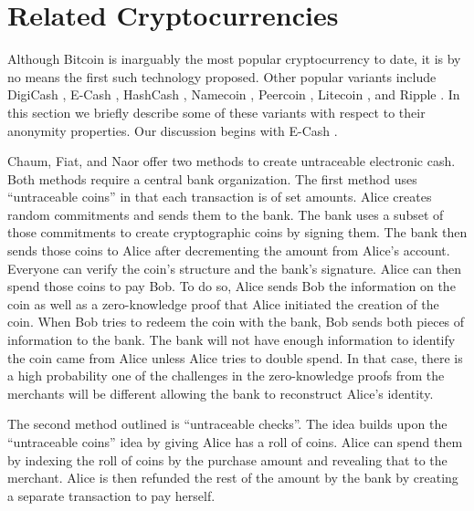 \section{Related Cryptocurrencies}
Although Bitcoin is inarguably the most popular cryptocurrency to date, it is by no means the first such technology proposed. Other popular variants include DigiCash \cite{digicash}, E-Cash \cite{ecash}, HashCash \cite{hashcash}, Namecoin \cite{namecoin}, Peercoin \cite{peercoin}, Litecoin \cite{litecoin}, and Ripple \cite{ripple}. In this section we briefly describe some of these variants with respect to their anonymity properties. Our discussion begins with E-Cash \cite{ecash}.

Chaum, Fiat, and Naor offer two methods to create untraceable electronic cash. Both methods require a central bank organization.  The first method uses “untraceable coins” in that each transaction is of set amounts. Alice creates random commitments and sends them to the bank.  The bank uses a subset of those commitments to create cryptographic coins by signing them.  The bank then sends those coins to Alice after decrementing the amount from Alice’s account.  Everyone can verify the coin’s structure and the bank’s signature. Alice can then spend those coins to pay Bob.  To do so, Alice sends Bob the information on the coin as well as a zero-knowledge proof that Alice initiated the creation of the coin.  When Bob tries to redeem the coin with the bank, Bob sends both pieces of information to the bank.  The bank will not have enough information to identify the coin came from Alice unless Alice tries to double spend.  In that case, there is a high probability one of the challenges in the zero-knowledge proofs from the merchants will be different allowing the bank to reconstruct Alice’s identity.

The second method outlined is ``untraceable checks''.  The idea builds upon the “untraceable coins” idea by giving Alice has a roll of coins.  Alice can spend them by indexing the roll of coins by the purchase amount and revealing that to the merchant.  Alice is then refunded the rest of the amount by the bank by creating a separate transaction to pay herself.

